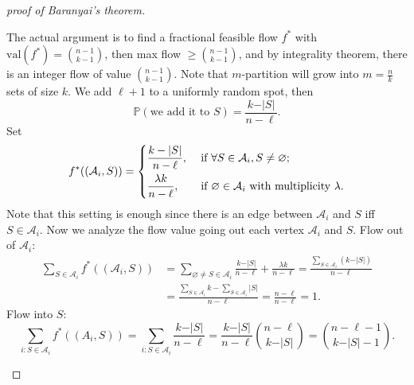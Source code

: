 \begin{proof}[proof of Baranyai's theorem]
\begin{itemize}
            The actual argument is to find a fractional feasible flow \(f^*\) with \(\mathrm{val}(f^*) = \binom{n - 1}{k - 1} \), then max flow \(\ge \binom{n - 1}{k - 1}\), and by integrality theorem, there is an integer flow of value \(\binom{n - 1}{k - 1}\). Note that \(m\)-partition will grow into \(m = \frac{n}{k}\) sets of size \(k\). We add \(\ell + 1\) to a uniformly random spot, then 
            \[
                \mathbb{P} (\text{we add it to } S) = \frac{k - \vert S \vert }{n - \ell}.
            \]             
            Set 
            \[
                f^*((\mathcal{A}_i, S)) = \begin{dcases}
                    \frac{k - \vert S \vert }{n - \ell}, &\text{ if } \forall S \in \mathcal{A}_i, S \neq \varnothing ;\\
                    \frac{\lambda k}{n - \ell }, &\text{ if }\varnothing \in \mathcal{A}_i \text{ with multiplicity } \lambda.
                \end{dcases}
            \]
            Note that this setting is enough since there is an edge between \(\mathcal{A}_i\) and \(S\) iff \(S \in \mathcal{A}_i\). Now we analyze the flow value going out each vertex \(\mathcal{A}_i\) and \(S\).     
            Flow out of \(\mathcal{A}_i\):
            \begin{align*}
                \sum_{S \in \mathcal{A}_i} f^*((\mathcal{A}_i, S)) &= \sum_{\varnothing \neq S \in \mathcal{A}_i} \frac{k - \vert S \vert }{n - \ell} + \frac{\lambda k}{n - \ell} = \frac{\sum_{S \in \mathcal{A}_i} (k - \vert S \vert )}{n - \ell} \\
                &= \frac{\sum_{S \in \mathcal{A}_i} k - \sum_{S \in \mathcal{A}_i} \vert S \vert  }{n - \ell} = \frac{n - \ell}{n - \ell } = 1.   
            \end{align*} 
            Flow into \(S\):
            \[
                \sum_{i: S \in \mathcal{A}_i} f^*((A_i, S)) = \sum_{i: S \in \mathcal{A}_i} \frac{k - \vert S \vert }{n - \ell} = \frac{k - \vert S \vert }{n - \ell } \binom{n - \ell}{k - \vert S \vert } = \binom{n - \ell - 1}{k - \vert S \vert - 1}.  
            \] 
            \begin{figure}[H]
                \centering
\end{figure}
\end{itemize}
\end{proof}
